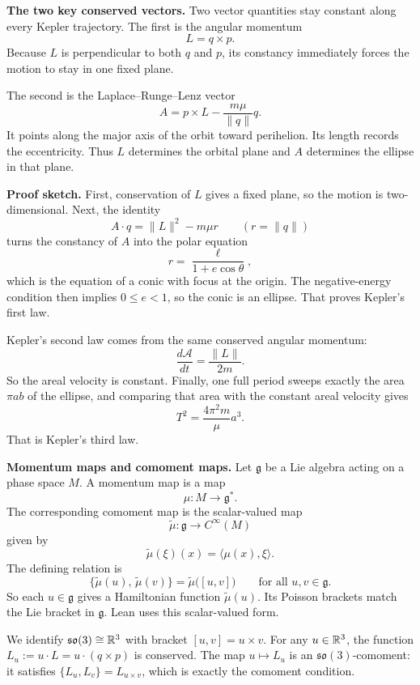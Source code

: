 \medskip
\noindent\textbf{The two key conserved vectors.}
Two vector quantities stay constant along every Kepler trajectory.
The first is the angular momentum
\[
  L = q \times p.
\]
Because $L$ is perpendicular to both $q$ and $p$, its constancy immediately forces the motion to stay in one fixed plane.

The second is the Laplace--Runge--Lenz vector
\[
  A = p \times L - \frac{m\mu}{\|q\|}q.
\]
It points along the major axis of the orbit toward perihelion.
Its length records the eccentricity.
Thus $L$ determines the orbital plane and $A$ determines the ellipse in that plane.

\medskip
\noindent\textbf{Proof sketch.}
First, conservation of $L$ gives a fixed plane, so the motion is two-dimensional.
Next, the identity
\[
  A \cdot q = \|L\|^2 - m\mu r
  \qquad (r = \|q\|)
\]
turns the constancy of $A$ into the polar equation
\[
  r = \frac{\ell}{1 + e\cos\theta},
\]
which is the equation of a conic with focus at the origin.
The negative-energy condition then implies $0 \le e < 1$, so the conic is an ellipse.
That proves Kepler's first law.

Kepler's second law comes from the same conserved angular momentum:
\[
  \frac{d\mathcal A}{dt} = \frac{\|L\|}{2m}.
\]
So the areal velocity is constant.
Finally, one full period sweeps exactly the area $\pi ab$ of the ellipse, and comparing that area with the constant areal velocity gives
\[
  T^2 = \frac{4\pi^2 m}{\mu}a^3.
\]
That is Kepler's third law.

\medskip
\noindent\textbf{Momentum maps and comoment maps.}
Let $\mathfrak{g}$ be a Lie algebra acting on a phase space $M$.
A momentum map is a map
\[
  \mu \colon M \longrightarrow \mathfrak{g}^*.
\]
The corresponding comoment map is the scalar-valued map
\[
  \tilde\mu \colon \mathfrak{g} \longrightarrow C^\infty(M)
\]
given by
\[
  \tilde\mu(\xi)(x) = \langle \mu(x), \xi \rangle.
\]
The defining relation is
\[
  \bigl\{\tilde\mu(u),\,\tilde\mu(v)\bigr\} = \tilde\mu\bigl([u,v]\bigr)
  \qquad \text{for all } u, v \in \mathfrak{g}.
\]
So each $u \in \mathfrak{g}$ gives a Hamiltonian function $\tilde\mu(u)$.
Its Poisson brackets match the Lie bracket in $\mathfrak{g}$.
Lean uses this scalar-valued form.

We identify $\mathfrak{so}(3) \cong \mathbb{R}^3$ with bracket $[u,v] = u \times v$.
For any $u \in \mathbb{R}^3$, the function $L_u := u \cdot L = u \cdot (q \times p)$ is conserved.
The map $u \mapsto L_u$ is an $\mathfrak{so}(3)$-comoment: it satisfies
$\{L_u, L_v\} = L_{u \times v}$,
which is exactly the comoment condition.

